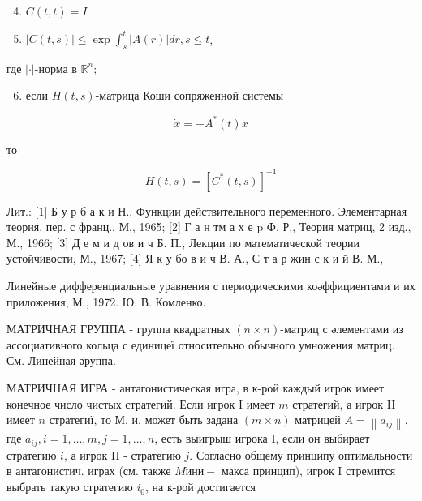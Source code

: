 \documentclass[10pt]{article}
\begin{document}
\begin{enumerate}

  \setcounter{enumi}{3}

  \item $C(t, t)=I$



  \item $|C(t, s)| \leqslant \exp \int_{s}^{t}|A(r)| d r, s \leqslant t$,



\end{enumerate}



где $|\cdot|$-норма в $\mathbb{R}^{n}$;



\begin{enumerate}

  \setcounter{enumi}{5}

  \item если $H(t, s)$-матрица Коши сопряженной системы

\end{enumerate}



\[

\dot{x}=-A^{*}(t) x

\]



то



\[

H(t, s)=\left[C^{*}(t, s)\right]^{-1}

\]



Лит.: [1] Б у р б а к и Н., Функции действительного переменного. Элементарная теория, пер. с франц., М., 1965; [2] Г а н тм а х е p Ф. Р., Теория матриц, 2 изд., М., 1966; [3] Д е м и д ов и ч Б. П., Лекции по математической теории устойчивости, М., 1967; [4] Я к у бо в и ч В. А., С т а р жин с к и й В. М.,

Линейные дифференциальные уравнения с периодическими коәффициентами и их приложения, М., 1972. Ю. В. Комленко.



МАТРИЧНАЯ ГРУППА - группа квадратных $(n \times n)$-матриц с әлементами из ассоциативного кольца с единицеї относительно обычного умножения матриц. См. Линейная әруппа.



МАТРИЧНАЯ ИГРА - антагонистическая игра, в к-роӥ каждый игрок имеет конечное число чистых стратегий. Если игрок I имеет $m$ стратегий, а игрок II имеет $n$ стратегиї, то М. и. может быть задана $(m \times n)$ матрицей $A=\left\|a_{i j}\right\|$, где $a_{i j}, i=1, \ldots, m, j=1, \ldots, n$, есть выигрыш игрока I, если он выбирает стратегию $i$, а игрок II - стратегию $j$. Согласно общему принципу оптимальности в антагонистич. играх (см. также $M и н и-$ макса принцип), игрок I стремится выбрать такую стратегию $i_{0}$, на к-рой достигается
\end{document}
